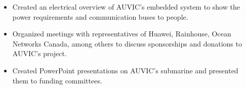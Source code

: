 \documentclass[10pt,a4paper,ragged2e,withhyper]{altacv}
\begin{document}
\begin{paracol}{2}


\begin{itemize}
	\item Created an electrical overview of AUVIC's embedded system to show the power requirements and communication buses to people.
	\item Organized meetings with representatives of Huawei, Rainhouse, Ocean Networks Canada, among others to discuss sponsorships and donations to AUVIC's project.
	\item Created PowerPoint presentations on AUVIC's submarine and presented them to funding committees.
\end{itemize}\enskip





\end{paracol}
\end{document}
